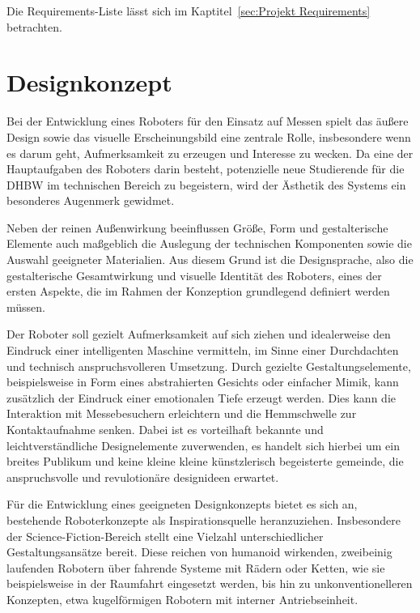 Die Requirements-Liste lässt sich im Kaptitel~\ref{sec:Projekt Requirements} betrachten.

\section{Designkonzept}
\label{cha:Designkonzept}

Bei der Entwicklung eines Roboters für den Einsatz auf Messen spielt das äußere Design sowie das visuelle Erscheinungsbild eine zentrale Rolle, insbesondere wenn es darum geht, Aufmerksamkeit zu erzeugen und Interesse zu wecken. Da eine der Hauptaufgaben des Roboters darin besteht, potenzielle neue Studierende für die DHBW im technischen Bereich zu begeistern, wird der Ästhetik des Systems ein besonderes Augenmerk gewidmet.

Neben der reinen Außenwirkung beeinflussen Größe, Form und gestalterische Elemente auch maßgeblich die Auslegung der technischen Komponenten sowie die Auswahl geeigneter Materialien. Aus diesem Grund ist die Designsprache, also die gestalterische Gesamtwirkung und visuelle Identität des Roboters, eines der ersten Aspekte, die im Rahmen der Konzeption grundlegend definiert werden müssen.

Der Roboter soll gezielt Aufmerksamkeit auf sich ziehen und idealerweise den Eindruck einer intelligenten Maschine vermitteln, im Sinne einer Durchdachten und technisch anspruchsvolleren Umsetzung. Durch gezielte Gestaltungselemente, beispielsweise in Form eines abstrahierten Gesichts oder einfacher Mimik, kann zusätzlich der Eindruck einer emotionalen Tiefe erzeugt werden. Dies kann die Interaktion mit Messebesuchern erleichtern und die Hemmschwelle zur Kontaktaufnahme senken. Dabei ist es vorteilhaft bekannte und leichtverständliche Designelemente zuverwenden, es handelt sich hierbei um ein breites Publikum und keine kleine kleine künstzlerisch begeisterte gemeinde, die anspruchsvolle und revulotionäre designideen erwartet. %

Für die Entwicklung eines geeigneten Designkonzepts bietet es sich an, bestehende Roboterkonzepte als Inspirationsquelle heranzuziehen. Insbesondere der Science-Fiction-Bereich stellt eine Vielzahl unterschiedlicher Gestaltungsansätze bereit. Diese reichen von humanoid wirkenden, zweibeinig laufenden Robotern über fahrende Systeme mit Rädern oder Ketten, wie sie beispielsweise in der Raumfahrt eingesetzt werden, bis hin zu unkonventionelleren Konzepten, etwa kugelförmigen Robotern mit interner Antriebseinheit.

